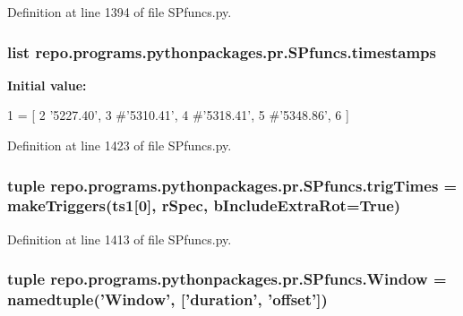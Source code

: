 Definition at line 1394 of file S\-Pfuncs.\-py.

\hypertarget{namespacerepo_1_1programs_1_1pythonpackages_1_1pr_1_1SPfuncs_ab1cf4f0f232b2ccd32f08baa27263f1b}{
\subsubsection[{timestamps}]{\setlength{\rightskip}{0pt plus 5cm}list repo.\-programs.\-pythonpackages.\-pr.\-S\-Pfuncs.\-timestamps}}\label{namespacerepo_1_1programs_1_1pythonpackages_1_1pr_1_1SPfuncs_ab1cf4f0f232b2ccd32f08baa27263f1b}
{\bfseries Initial value\-:}
\begin{DoxyCode}
1 = [
2             \textcolor{stringliteral}{'5227.40'},
3             \textcolor{comment}{#'5310.41',}
4             \textcolor{comment}{#'5318.41',}
5             \textcolor{comment}{#'5348.86',}
6         ]
\end{DoxyCode}


Definition at line 1423 of file S\-Pfuncs.\-py.

\hypertarget{namespacerepo_1_1programs_1_1pythonpackages_1_1pr_1_1SPfuncs_a165fa263d040e95cba983de350ee563f}{
\subsubsection[{trig\-Times}]{\setlength{\rightskip}{0pt plus 5cm}tuple repo.\-programs.\-pythonpackages.\-pr.\-S\-Pfuncs.\-trig\-Times = {\bf make\-Triggers}(ts1\mbox{[}0\mbox{]}, {\bf r\-Spec}, b\-Include\-Extra\-Rot=True)}}\label{namespacerepo_1_1programs_1_1pythonpackages_1_1pr_1_1SPfuncs_a165fa263d040e95cba983de350ee563f}


Definition at line 1413 of file S\-Pfuncs.\-py.

\hypertarget{namespacerepo_1_1programs_1_1pythonpackages_1_1pr_1_1SPfuncs_a5f881c246a0ac49955b33746df6c379b}{
\subsubsection[{Window}]{\setlength{\rightskip}{0pt plus 5cm}tuple repo.\-programs.\-pythonpackages.\-pr.\-S\-Pfuncs.\-Window = namedtuple('Window', \mbox{[}'duration', 'offset'\mbox{]})}}\label{namespacerepo_1_1programs_1_1pythonpackages_1_1pr_1_1SPfuncs_a5f881c246a0ac49955b33746df6c379b}


